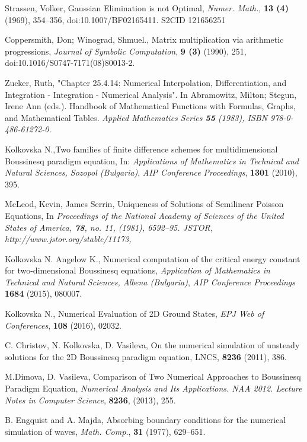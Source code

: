 \documentclass{article}
\theoremstyle{remark}
\begin{document}
\begin{thebibliography}{99}
Strassen, Volker, Gaussian Elimination is not Optimal,
{\it Numer. Math.}, \textbf{13 (4)} (1969), 354–356, doi:10.1007/BF02165411. S2CID 121656251

 Coppersmith, Don; Winograd, Shmuel., Matrix multiplication via arithmetic progressions,
{\it  Journal of Symbolic Computation}, \textbf{9 (3)} (1990), 251, doi:10.1016/S0747-7171(08)80013-2.

Zucker, Ruth, "Chapter 25.4.14: Numerical Interpolation, Differentiation, and Integration - Integration - Numerical Analysis". In Abramowitz, Milton; Stegun, Irene Ann (eds.). Handbook of Mathematical Functions with Formulas, Graphs, and Mathematical Tables. 
\it{Applied Mathematics Series} \textbf{55}  (1983), ISBN 978-0-486-61272-0.

 Kolkovska N.,Two families of finite difference schemes for multidimensional Boussinesq paradigm equation, In:
{\it Applications of Mathematics in Technical and Natural Sciences,  Sozopol (Bulgaria)},
\emph{AIP Conference Proceedings}, \textbf{1301} (2010), 395.

 McLeod, Kevin, James Serrin, Uniqueness of Solutions of Semilinear Poisson Equations, In \it{Proceedings of the National Academy of Sciences of the United States of America}, \textbf{78}, no. 11, (1981), 6592–95. JSTOR, http://www.jstor.org/stable/11173,

 Kolkovska N. Angelow K., Numerical computation of the critical energy constant for two-dimensional Boussinesq equations,
{\it Application of Mathematics in Technical and Natural Sciences, Albena (Bulgaria)},
\emph{AIP Conference Proceedings}  \textbf{1684} (2015), 080007.

 Kolkovska N., Numerical Evaluation of 2D Ground States,
\emph{ EPJ Web of Conferences}, \textbf{108} (2016), 02032.

C. Christov, N. Kolkovska, D. Vasileva, On the numerical simulation of unsteady solutions for the 2D Boussinesq paradigm equation, LNCS, \textbf{8236}  (2011), 386.

M.Dimova, D. Vasileva, Comparison of Two Numerical Approaches to Boussinesq Paradigm Equation, 
{\it Numerical Analysis and Its Applications. NAA 2012. Lecture Notes in Computer Science}, \textbf{8236}, (2013), 255.

 B. Engquist and A. Majda, Absorbing boundary conditions for the numerical simulation of waves, {\it Math. Comp.}, \textbf{31} (1977), 629–651.


\end{thebibliography}
\end{document}
